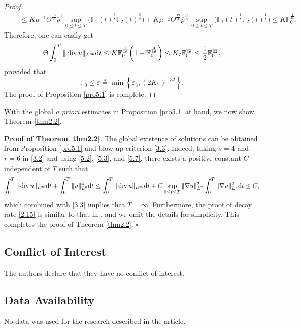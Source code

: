\documentclass[11pt]{article}
\DeclareMathOperator{\divv}{div}
\begin{document}
\begin{proof}
\begin{align*}
& \quad \leq K \mu^{-1} \Theta^{\frac{15}{4}} \bar{\rho}^{\frac{9}{8}} \sup_{0 \leq t \leq T}\Big(\mathbb{F}_1 (t)^{\frac{5}{8}} \mathbb{F}_2 (t)^{\frac{5}{8}}\Big)+ K \mu^{-\frac{1}{2}} \Theta^{\frac{19}{4}} \bar{\rho}^{\frac{13}{8}} \sup_{0 \leq t \leq T} \Big(\mathbb{F}_1 (t)^{\frac{1}{8}} \mathbb{F}_2 (t)^{\frac{1}{8}}\Big)\leq K \mathbb{F}_0^{\frac{1}{16}}.
\end{align*}
Therefore, one can easily get
\begin{align*}
\Theta \int^T_0 \|\divv u\|_{L^{\infty}} {\rm d} t \leq K \mathbb{F}_0^{\frac{1}{16}} \bigg(1 + \mathbb{F}_0^{\frac{3}{16}} \bigg) \leq K_7 \mathbb{F}_0^{\frac{1}{16}} \leq \frac{1}{2} \mathbb{F}_0^{\frac{1}{32}},
\end{align*}
provided that
$$
\mathbb{F}_0 \leq \varepsilon \triangleq \min \left\{\varepsilon_3, (2 K_7)^{-32} \right\}.
$$
The proof of Proposition \ref{pro5.1} is complete.
\end{proof}

With the global {\it a priori} estimates in Proposition \ref{pro5.1} at hand, we now show Theorem \ref{thm2.2}.

{\bf Proof of Theorem \ref{thm2.2}}. The global existence of solutions can be obtained from Proposition \ref{pro5.1} and blow-up criterion \eqref{3.3}.
Indeed, taking $s=4$ and $r=6$ in \eqref{3.2} and using \eqref{5.2}, \eqref{5.3}, and \eqref{5.7}, there exists a positive constant $C$ independent of $T$ such that
$$
\int_{0}^T\|\divv u\|_{L^\infty} {\rm d}t+\int_{0}^T\|u\|_{L^6}^4{\rm d}t \le
\int_{0}^T \|\divv u\|_{L^\infty} {\rm d} t + C \sup_{0\leq t\leq T}\|\nabla u\|_{L^2}^{2}
\int_{0}^T \|\nabla u\|_{L^2}^{2}{\rm d}t \le C,
$$
which combined with \eqref{3.3} implies that $T=\infty$. Furthermore, the proof of decay rate \eqref{2.15} is similar to that in \cite{XZ2025}, and we omit the details for simplicity. This completes the proof of Theorem \ref{thm2.2}.
\hfill$\square$

\subsection*{Conflict of Interest}
The authors declare that they have no conflict of interest.

\subsection*{Data Availability}
No data was used for the research described in the article.
\end{document}
